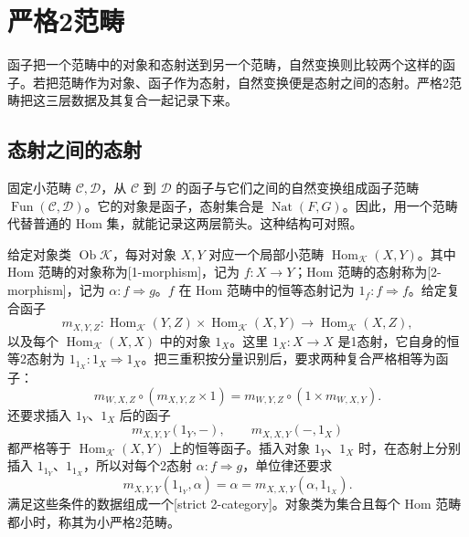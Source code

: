 
\section{严格2范畴}
\label{b4:sec:F01}

函子把一个范畴中的对象和态射送到另一个范畴，自然变换则比较两个这样的函子。若把范畴作为对象、函子作为态射，自然变换便是态射之间的态射。严格2范畴把这三层数据及其复合一起记录下来。

\subsection{态射之间的态射}
\label{b4:subsec:F01:01}

固定小范畴 \(\mathcal C,\mathcal D\)，从 \(\mathcal C\) 到 \(\mathcal D\) 的函子与它们之间的自然变换组成函子范畴 \(\operatorname{Fun}(\mathcal C,\mathcal D)\)。它的对象是函子，态射集合是 \(\operatorname{Nat}(F,G)\)。因此，用一个范畴代替普通的 Hom 集，就能记录这两层箭头。这种结构可对照\cite[Section 1.7, Lemma 1.7.7 and Definition 1.7.8]{Riehl2016CategoryTheory}。

\begin{definition}\label{b4:def:F-strict-two-category}
	给定对象类 \(\operatorname{Ob}\mathcal K\)，每对对象 \(X,Y\) 对应一个局部小范畴 \(\operatorname{Hom}_{\mathcal K}(X,Y)\)。其中 Hom 范畴的对象称为[1-morphism]，记为 \(f:X\rightarrow Y\)；Hom 范畴的态射称为[2-morphism]，记为 \(\alpha:f\Rightarrow g\)。\(f\) 在 Hom 范畴中的恒等态射记为 \(1_f:f\Rightarrow f\)。给定复合函子
	\[
		m_{X,Y,Z}:\operatorname{Hom}_{\mathcal K}(Y,Z) \times\operatorname{Hom}_{\mathcal K}(X,Y) \longrightarrow\operatorname{Hom}_{\mathcal K}(X,Z),
	\]
	以及每个 \(\operatorname{Hom}_{\mathcal K}(X,X)\) 中的对象 \(1_X\)。这里 \(1_X:X\rightarrow X\) 是1态射，它自身的恒等2态射为 \(1_{1_X}:1_X\Rightarrow1_X\)。把三重积按分量识别后，要求两种复合严格相等为函子：
	\[
		m_{W,X,Z}\circ(m_{X,Y,Z}\times1) =m_{W,Y,Z}\circ(1\times m_{W,X,Y}).
	\]
	还要求插入 \(1_Y\)、\(1_X\) 后的函子
	\[
		m_{X,Y,Y}(1_Y,-),\qquad m_{X,X,Y}(-,1_X)
	\]
	都严格等于 \(\operatorname{Hom}_{\mathcal K}(X,Y)\) 上的恒等函子。插入对象 \(1_Y\)、\(1_X\) 时，在态射上分别插入 \(1_{1_Y}\)、\(1_{1_X}\)，所以对每个2态射 \(\alpha:f\Rightarrow g\)，单位律还要求
	\[
		m_{X,Y,Y}(1_{1_Y},\alpha)=\alpha =m_{X,X,Y}(\alpha,1_{1_X}).
	\]
	满足这些条件的数据组成一个[strict 2-category]。对象类为集合且每个 Hom 范畴都小时，称其为小严格2范畴。
\end{definition}

